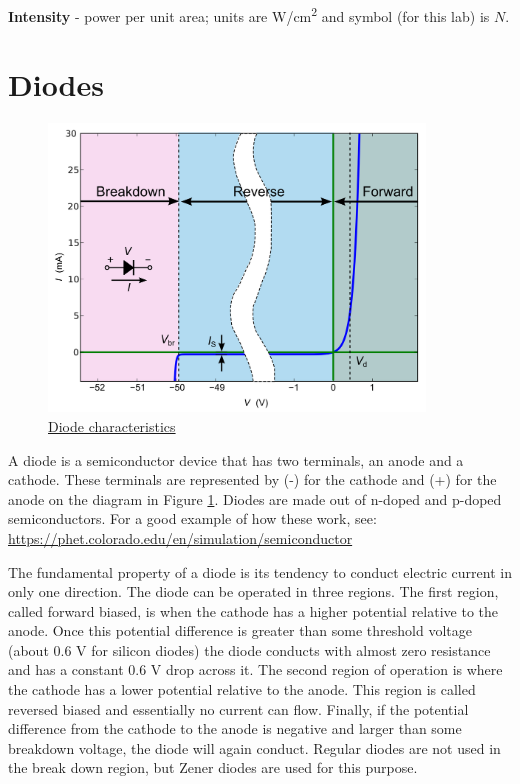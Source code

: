 \documentclass[10pt]{PhysLab1C} %
\begin{document}
\textbf{Intensity} - power per unit area; units are 
W/cm\textsuperscript{2} and symbol (for this lab) is $N$.



\section{Diodes}

\begin{figure}[h]\centering
    \includegraphics[width=10cm]{lab6fig/diode-characteristics.png}
    \caption{ \href{https://commons.wikimedia.org/wiki/File:Diode_current_wiki.png}{Diode characteristics}}
    \label{diode-char}
\end{figure}

A diode is a semiconductor device that has two terminals, an anode and a
cathode. These terminals are represented by (-) for the cathode and (+)
for the anode on the diagram in Figure \ref{diode-char}. Diodes are made out
of n-doped and p-doped semiconductors. For a good example of how these
work, see: \href{https://phet.colorado.edu/en/simulation/semiconductor}{https://phet.colorado.edu/en/simulation/semiconductor}

The fundamental property of a diode is its tendency to conduct electric
current in only one direction. The diode can be operated in three
regions. The first region, called forward biased, is when the cathode
has a higher potential relative to the anode. Once this potential
difference is greater than some threshold voltage (about 0.6
V for silicon diodes) the diode conducts with almost zero resistance and
has a constant 0.6 V drop across it. The second region of operation is
where the cathode has a lower potential relative to the anode. This
region is called reversed biased and essentially no current can flow.
Finally, if the potential difference from the cathode to the anode is
negative and larger than some breakdown voltage, the diode will again
conduct. Regular diodes are not used in the break down region, but Zener
diodes are used for this purpose.
\end{document}
